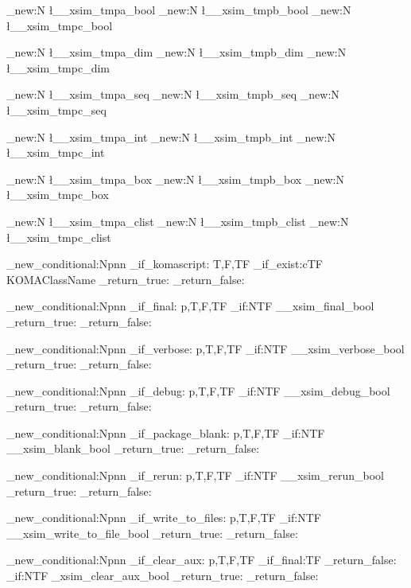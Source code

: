 \bool_new:N  \l__xsim_tmpa_bool
\bool_new:N  \l__xsim_tmpb_bool
\bool_new:N  \l__xsim_tmpc_bool

\dim_new:N   \l__xsim_tmpa_dim
\dim_new:N   \l__xsim_tmpb_dim
\dim_new:N   \l__xsim_tmpc_dim

\seq_new:N   \l__xsim_tmpa_seq
\seq_new:N   \l__xsim_tmpb_seq
\seq_new:N   \l__xsim_tmpc_seq

\int_new:N   \l__xsim_tmpa_int
\int_new:N   \l__xsim_tmpb_int
\int_new:N   \l__xsim_tmpc_int

\box_new:N   \l__xsim_tmpa_box
\box_new:N   \l__xsim_tmpb_box
\box_new:N   \l__xsim_tmpc_box

\clist_new:N \l__xsim_tmpa_clist
\clist_new:N \l__xsim_tmpb_clist
\clist_new:N \l__xsim_tmpc_clist


\prg_new_conditional:Npnn \xsim_if_komascript: {T,F,TF}
  {
    \cs_if_exist:cTF {KOMAClassName}
      { \prg_return_true: }
      { \prg_return_false: }
  }


\prg_new_conditional:Npnn \xsim_if_final: {p,T,F,TF}
  {
    \bool_if:NTF \g__xsim_final_bool
      { \prg_return_true: }
      { \prg_return_false: }
  }

\prg_new_conditional:Npnn \xsim_if_verbose: {p,T,F,TF}
  {
    \bool_if:NTF \g__xsim_verbose_bool
      { \prg_return_true: }
      { \prg_return_false: }
  }

\prg_new_conditional:Npnn \xsim_if_debug: {p,T,F,TF}
  {
    \bool_if:NTF \g__xsim_debug_bool
      { \prg_return_true: }
      { \prg_return_false: }
  }

\prg_new_conditional:Npnn \xsim_if_package_blank: {p,T,F,TF}
  {
    \bool_if:NTF \g__xsim_blank_bool
      { \prg_return_true: }
      { \prg_return_false: }
  }

\prg_new_conditional:Npnn \xsim_if_rerun: {p,T,F,TF}
  {
    \bool_if:NTF \g__xsim_rerun_bool
      { \prg_return_true: }
      { \prg_return_false: }
  }

\prg_new_conditional:Npnn \xsim_if_write_to_files: {p,T,F,TF}
  {
    \bool_if:NTF \g__xsim_write_to_file_bool
      { \prg_return_true: }
      { \prg_return_false: }
  }

\prg_new_conditional:Npnn \xsim_if_clear_aux: {p,T,F,TF}
  {
    \xsim_if_final:TF
      { \prg_return_false: }
      {
        \bool_if:NTF \g_xsim_clear_aux_bool
          { \prg_return_true: }
          { \prg_return_false: }
      }
  }

